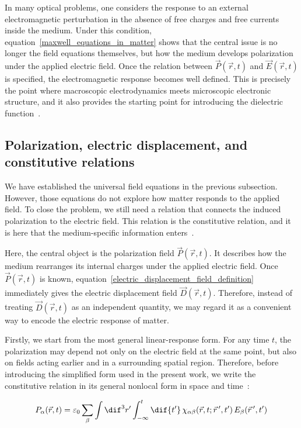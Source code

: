 In many optical problems, one considers the response to an external electromagnetic perturbation in the absence of free charges and free currents inside the medium.
Under this condition, equation~\eqref{maxwell_equations_in_matter} shows that the central issue is no longer the field equations themselves,
but how the medium develops polarization under the applied electric field.
Once the relation between $\vec{P}(\vec{r},t)$ and $\vec{E}(\vec{r},t)$ is specified, the electromagnetic response becomes well defined.
This is precisely the point where macroscopic electrodynamics meets microscopic electronic structure,
and it also provides the starting point for introducing the dielectric function~\cite{landau2013electrodynamics,lima2022usefulness,bernasconi2011first}.

\subsection{Polarization, electric displacement, and constitutive relations}

We have established the universal field equations in the previous subsection.
However, those equations do not explore how matter responds to the applied field.
To close the problem, we still need a relation that connects the induced polarization to the electric field.
This relation is the constitutive relation, and it is here that the medium-specific information enters~\cite{landau2013electrodynamics, lima2022usefulness}.

Here, the central object is the polarization field $\vec{P}(\vec{r},t)$.
It describes how the medium rearranges its internal charges under the applied electric field.
Once $\vec{P}(\vec{r},t)$ is known, equation~\eqref{electric_displacement_field_definition} immediately gives the electric displacement field $\vec{D}(\vec{r},t)$.
Therefore, instead of treating $\vec{D}(\vec{r},t)$ as an independent quantity, we may regard it as a convenient way to encode the electric response of matter.

Firstly, we start from the most general linear-response form.
For any time $t$, the polarization may depend not only on the electric field at the same point,
but also on fields acting earlier and in a surrounding spatial region.
Therefore, before introducing the simplified form used in the present work,
we write the constitutive relation in its general nonlocal form in space and time~\cite{royo2019first}:

\begin{equation}
    P_\alpha(\vec{r},t) =
    \varepsilon_0\sum_\beta\int\dif^3{r'}
    \int_{-\infty}^{t}\dif{t'}
    \,\chi_{\alpha\beta}(\vec{r},t;\vec{r}\,',t')\,E_\beta(\vec{r}\,',t')
\label{general_nonlocal_constitutive_relation}
\end{equation}

